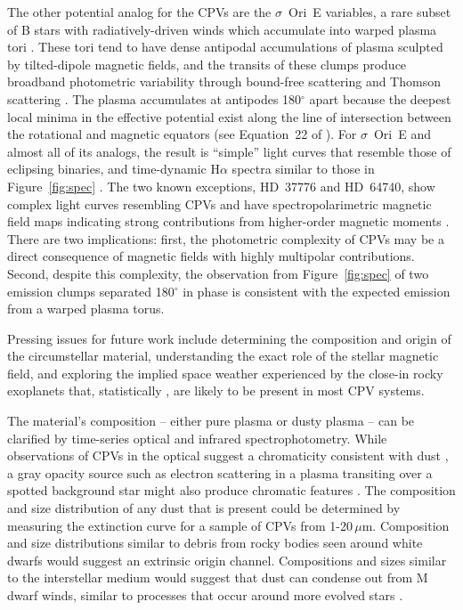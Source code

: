 \documentclass{nature3}
\begin{document}
The other potential analog for the CPVs are the $\sigma$~Ori~E
variables, a rare subset of B stars with radiatively-driven winds
which accumulate into warped plasma tori
\cite{Townsend2005,Townsend2008}.  These tori tend to have dense
antipodal accumulations of plasma sculpted by tilted-dipole magnetic
fields, and the transits of these clumps produce broadband photometric
variability through bound-free scattering \cite{Townsend2005} and
Thomson scattering \cite{Berry2022}.  The plasma accumulates at
antipodes 180$^\circ$ apart because the deepest local minima in the
effective potential exist along the line of intersection between the
rotational and magnetic equators (see Equation~22 of
\cite{Townsend2005}).  For $\sigma$~Ori~E and almost all of its
analogs, the result is ``simple'' light curves that resemble those of
eclipsing binaries, and time-dynamic H$\alpha$ spectra similar to
those in Figure~\ref{fig:spec} \cite{Townsend2005,Townsend2008}.  The
two known exceptions, HD~37776 and HD~64740, show complex light curves
resembling CPVs \cite{Mikulasek2020,Bouma2024} and have
spectropolarimetric magnetic field maps indicating strong
contributions from higher-order magnetic moments
\cite{Kochukhov2011,Shultz2018}.  There are two implications: first,
the photometric complexity of CPVs may be a direct consequence of
magnetic fields with highly multipolar contributions.  Second, despite
this complexity, the observation from Figure~\ref{fig:spec} of two
emission clumps separated 180$^\circ$ in phase is consistent with the
expected emission from a warped plasma torus.

Pressing issues for future work include determining the composition
and origin of the circumstellar material, understanding the exact role
of the stellar magnetic field, and exploring the implied space weather
experienced by the close-in rocky exoplanets that, statistically
\cite{Dressing2015}, are likely to be present in most CPV systems.

The material's composition -- either pure plasma or dusty plasma --
can be clarified by time-series optical and infrared
spectrophotometry.  While observations of CPVs in the optical suggest
a chromaticity consistent with dust
\cite{Tanimoto2020,Gunther2022,Koen2023}, a gray opacity source such
as electron scattering in a plasma transiting over a spotted
background star might also produce chromatic features
\cite{Rackham2018}.  The composition and size distribution of any dust
that is present could be determined by measuring the extinction curve
for a sample of CPVs from 1-20\,$\mu$m.  Composition and size
distributions similar to debris from rocky bodies seen around white
dwarfs \cite{Reach2009} would suggest an extrinsic origin channel.
Compositions and sizes similar to the interstellar medium would
suggest that dust can condense out from M dwarf winds, similar to
processes that occur around more evolved stars \cite{Marigo2008}.
\end{document}

